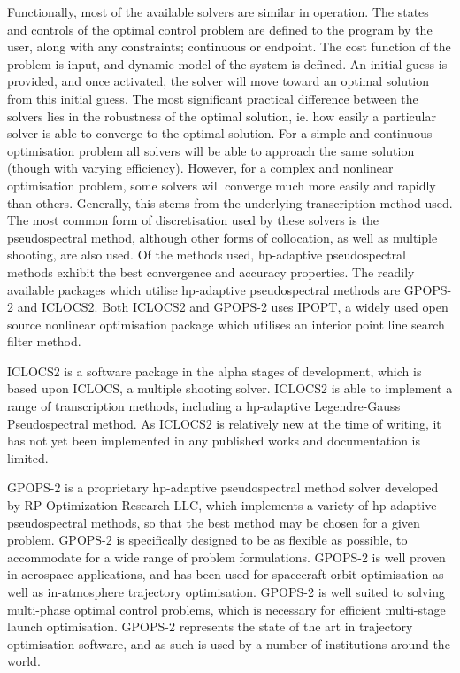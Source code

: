 Functionally, most of the available solvers are similar in operation. The states and controls of the optimal control problem are defined to the program by the user, along with any constraints; continuous or endpoint. The cost function of the problem is input, and dynamic model of the system is defined. An initial guess is provided, and once activated, the solver will move toward an optimal solution from this initial guess. 
The most significant practical difference between the solvers lies in the robustness of the optimal solution, ie. how easily a particular solver is able to converge to the optimal solution. For a simple and continuous optimisation problem all solvers will be able to approach the same solution (though with varying efficiency). However, for a complex and nonlinear optimisation problem, some solvers will converge much more easily and rapidly than others. Generally, this stems from the underlying transcription method used. 
The most common form of discretisation used by these solvers is the pseudospectral method, although other forms of collocation, as well as multiple shooting, are also used. Of the methods used, \textsf{hp}-adaptive pseudospectral methods exhibit the best convergence and accuracy properties\cite{Chai2015}. The readily available packages which utilise \textsf{hp}-adaptive pseudospectral methods are GPOPS-2\cite{Rao2010} and ICLOCS2\cite{iclocs}. Both ICLOCS2 and GPOPS-2 uses IPOPT\cite{Wachter2006}, a widely used open source nonlinear optimisation package which utilises an interior point line search filter method. 




ICLOCS2 is a software package in the alpha stages of development, which is based upon ICLOCS, a multiple shooting solver\cite{iclocs}. ICLOCS2 is able to implement a range of transcription methods, including a \textsf{hp}-adaptive Legendre-Gauss Pseudospectral method\cite{iclocs}. As ICLOCS2 is relatively new at the time of writing, it has not yet been implemented in any published works and documentation is limited. 

GPOPS-2 is a proprietary \textsf{hp}-adaptive pseudospectral method solver developed by RP Optimization Research LLC, which implements a variety of \textsf{hp}-adaptive pseudospectral methods, so that the best method may be chosen for a given problem\cite{Rao2010}. GPOPS-2 is specifically designed to be as flexible as possible, to accommodate for a wide range of problem formulations\cite{Rao2010}. GPOPS-2 is well proven in aerospace applications, and has been used for spacecraft orbit optimisation as well as in-atmosphere trajectory optimisation\cite{Rizvi2015,Lipp2014}. GPOPS-2 is well suited to solving multi-phase optimal control problems, which is necessary for efficient multi-stage launch optimisation\cite{Rao2010}. GPOPS-2 represents the state of the art in trajectory optimisation software, and as such is used by a number of institutions around the world. 




